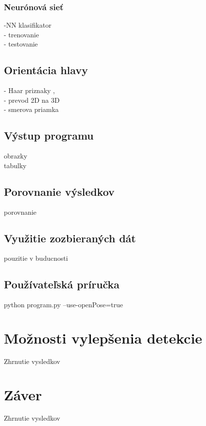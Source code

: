 \documentclass[slovak,master,dept460,male,cpp,cpdeclaration]{diploma}
\begin{document}
\newpage
\subsubsection{Neurónová sieť}
-NN klasifikator\\
- trenovanie \\
- testovanie



\newpage
\subsection{Orientácia hlavy}
- Haar  priznaky ,\\
- prevod 2D na 3D \\
- smerova priamka

\newpage
\subsection{Výstup programu}
obrazky\\
tabulky

\newpage
\subsection{Porovnanie výsledkov}
porovnanie


\newpage
\subsection{Využitie zozbieraných dát}
pouzitie v buducnosti


\newpage
\subsection{Používateľská príručka}
python program.py --use-openPose=true


\newpage
\section{Možnosti vylepšenia detekcie}
\label{sec:Možnosti vylepšenia detekcie}
Zhrnutie vysledkov


\newpage
\section{Záver}
\label{sec:Zaver}
Zhrnutie vysledkov








\end{document}
